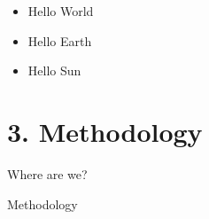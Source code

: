 \documentclass[xcolor=dvipsnames]{beamer}
\begin{document}
    \begin{frame}    
        \begin{itemize}[<+-| alert@+>]
            \item Hello World
            \item Hello Earth
            \item Hello Sun
        \end{itemize}
        \uncover<+>{} %
    \end{frame}


\section{ 3. Methodology}

\begin{frame}{Where are we?}
\end{frame}

\begin{frame}{Methodology}
    
\end{frame}



    
\end{document}
